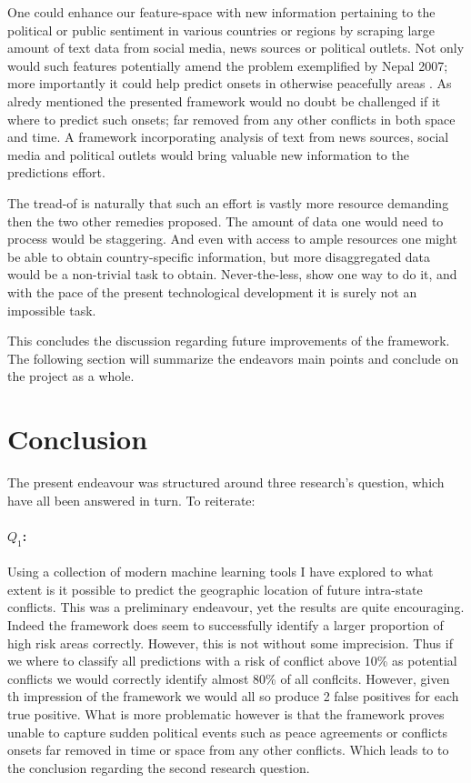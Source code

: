 \documentclass[a4paper]{article}
\begin{document}
One could enhance our feature-space with new information pertaining to the political or public sentiment in various countries or regions by scraping large amount of text data from social media, news sources or political outlets. Not only would such features potentially amend the problem exemplified by Nepal 2007; more importantly it could help predict onsets in otherwise peacefully areas \cite{mueller_2016}. As alredy mentioned the presented framework would no doubt be challenged if it where to predict such onsets; far removed from any other conflicts in both space and time. A framework incorporating analysis of text from news sources, social media and political outlets would bring valuable new information to the predictions effort.\par

The tread-of is naturally that such an effort is vastly more resource demanding then the two other remedies proposed. The amount of data one would need to process would be staggering. And even with access to ample resources one might be able to obtain country-specific information, but more disaggregated data would be a non-trivial task to obtain. Never-the-less, \cite{mueller_2016} show one way to do it, and with the pace of the present technological development it is surely not an impossible task.\par 

This concludes the discussion regarding future improvements of the framework. The following section will summarize the endeavors main points and conclude on the project as a whole.\par

\section{Conclusion}

The present endeavour was structured around three research's question, which have all been answered in turn. To reiterate:

\paragraph{$Q_1$:} Using a collection of modern machine learning tools I have explored to what extent is it possible to predict the geographic location of future intra-state conflicts. This was a preliminary endeavour, yet the results are quite encouraging. Indeed the framework does seem to successfully identify a larger proportion of high risk areas correctly. However, this is not without some imprecision. Thus if we where to classify all predictions with a risk of conflict above 10\% as potential conflicts we would correctly identify almost 80\% of all conflcits. However, given th impression of the framework we would all so produce 2 false positives for each true positive. What is more problematic however is that the framework proves unable to capture sudden political events such as peace agreements or conflicts onsets far removed in time or space from any other conflicts. Which leads to to the conclusion regarding the second research question.\par
\end{document}
